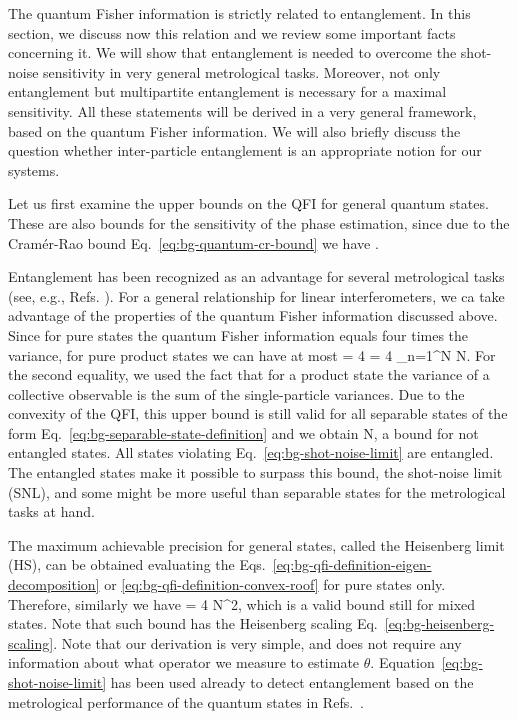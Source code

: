 
The quantum Fisher information is strictly related to entanglement.
In this section, we discuss now this relation and we review some important facts concerning it.
We will show that entanglement is needed to overcome the shot-noise sensitivity in very general metrological tasks.
Moreover, not only entanglement but multipartite entanglement is necessary for a maximal sensitivity.
All these statements will be derived in a very general framework, based on the quantum Fisher information.
We will also briefly discuss the question whether inter-particle entanglement is an appropriate notion for our systems.

Let us first examine the upper bounds on the QFI for general quantum states.
These are also bounds for the sensitivity of the phase estimation, since due to the Cram\'er-Rao bound Eq.~\eqref{eq:bg-quantum-cr-bound} we have
\be
  \varinv{\theta} \leq \qfi[\rho, J_z].
\ee

Entanglement has been recognized as an advantage for several metrological tasks (see, e.g., Refs. \citep{MR82, 119}).
For a general relationship for linear interferometers, we ca take advantage of the properties of the quantum Fisher information discussed above.
Since for pure states the quantum Fisher information equals four times the variance, for pure product states we can have at most
\be
  \qfi[\rho,J_z] = 4 = 4 \sum_{n=1}^N  \leq N.
\ee
For the second equality, we used the fact that for a product state the variance of a collective observable is the sum of the single-particle variances.
Due to the convexity of the QFI, this upper bound is still valid for all separable states of the form Eq.~\eqref{eq:bg-separable-state-definition} and we obtain \citep{MR120}
\be
  \label{eq:bg-shot-noise-limit}
  \qfi[\rho, J_z] \leq N,
\ee
a bound for not entangled states.
All states violating Eq.~\eqref{eq:bg-shot-noise-limit} are entangled.
The entangled states make it possible to surpass this bound, the shot-noise limit (SNL), and some might be more useful than separable states for the metrological tasks at hand.

The maximum achievable precision for general states, called the Heisenberg limit (HS), can be obtained evaluating the Eqs.~\eqref{eq:bg-qfi-definition-eigen-decomposition} or \eqref{eq:bg-qfi-definition-convex-roof} for pure states only.
Therefore, similarly we have
\be
  \label{eq:bg-heisenberg-limit}
  \qfi[\rho, J_z] = 4 \leq N^2,
\ee
which is a valid bound still for mixed states.
Note that such bound has the Heisenberg scaling Eq.~\eqref{eq:bg-heisenberg-scaling}.
Note that our derivation is very simple, and does not require any information about what operator we measure to estimate $\theta$.
Equation~\eqref{eq:bg-shot-noise-limit} has been used already to detect entanglement based on the metrological performance of the quantum states in Refs.~\citep{MR72, MR10}.
